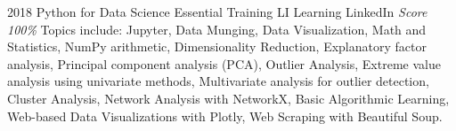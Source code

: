 \documentclass[11pt,a4paper]{moderncv}
\begin{document}
\cventry
    {2018}
    {Python for Data Science Essential Training}
    {LI Learning}
    {LinkedIn}
    {\textit{Score 100\%}}
    {
        Topics include:                                                          %
            Jupyter,                                                          %
            Data Munging,                                                          %
            Data Visualization,                                                          %
            Math and Statistics,                                                          %
            NumPy arithmetic,                                                          %
            Dimensionality Reduction,                                                          %
            Explanatory factor analysis,                                                          %
            Principal component analysis (PCA),                                                          %
            Outlier Analysis,                                                          %
            Extreme value analysis using univariate methods,                                                          %
            Multivariate analysis for outlier detection,                                                          %
            Cluster Analysis,                                                          %
            Network Analysis with NetworkX,                                                          %
            Basic Algorithmic Learning,                                                          %
            Web-based Data Visualizations with Plotly,                                                          %
            Web Scraping with Beautiful Soup.                                                          %
    }
\end{document}
